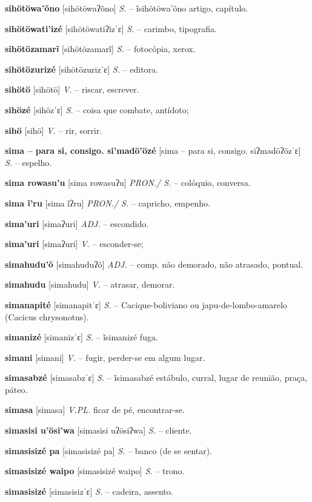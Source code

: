 \textbf{sihötöwa'õno} [sihötöwaʔõno] \textit{S.} -- ĩsihötöwa'õno artigo, capítulo.

\textbf{sihötöwati'izé} [sihötöwatiʔizˈɛ] \textit{S.} -- carimbo, tipografia.

\textbf{sihötözamarĩ} [sihötözamarĩ] \textit{S.} -- fotocópia, xerox.

\textbf{sihötözurizé} [sihötözurizˈɛ] \textit{S.} -- editora.

\textbf{sihötö} [sihötö] \textit{V.} -- riscar, escrever.

\textbf{sihözé} [sihözˈɛ] \textit{S.} -- coisa que combate, antídoto;

\textbf{sihö} [sihö] \textit{V.} -- rir, sorrir.

\textbf{sima -- para si, consigo. si'madö'özé} [sima -- para si, consigo. siʔmadöʔözˈɛ] \textit{S.} -- espelho.

\textbf{sima rowasu'u} [sima rowasuʔu] \textit{PRON./ S.} -- colóquio, conversa.

\textbf{sima ĩ'ru} [sima ĩʔru] \textit{PRON./ S.} -- capricho, empenho.

\textbf{sima'uri} [simaʔuri] \textit{ADJ.} -- escondido.

\textbf{sima'uri} [simaʔuri] \textit{V.} -- esconder-se;

\textbf{simahudu'õ} [simahuduʔõ] \textit{ADJ.} -- comp. não demorado, não atrasado, pontual.

\textbf{simahudu} [simahudu] \textit{V.} -- atrasar, demorar.

\textbf{simanapité} [simanapitˈɛ] \textit{S.} -- Cacique-boliviano ou japu-de-lombo-amarelo (Cacicus chrysonotus).

\textbf{simanizé} [simanizˈɛ] \textit{S.} -- ĩsimanizé fuga.

\textbf{simani} [simani] \textit{V.} -- fugir, perder-se em algum lugar.

\textbf{simasabzé} [simasabzˈɛ] \textit{S.} -- ĩsimasabzé estábulo, curral, lugar de reunião, praça, páteo.

\textbf{simasa} [simasa] \textit{V.PL.} ficar de pé, encontrar-se.

\textbf{simasisi u'ösi'wa} [simasisi uʔösiʔwa] \textit{S.} -- cliente.

\textbf{simasisizé pa} [simasisizé pa] \textit{S.} -- banco (de se sentar).

\textbf{simasisizé waipo} [simasisizé waipo] \textit{S.} -- trono.

\textbf{simasisizé} [simasisizˈɛ] \textit{S.} -- cadeira, assento.

